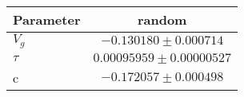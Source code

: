 \begin{tabular}{|l|c|}
    \hline
    Parameter & random \\
    \hline\hline
    $V_g$ & $-0.130180 \pm 0.000714$ \\
    \hline
    $\tau$ & $0.00095959 \pm 0.00000527$ \\
    \hline
    c & $-0.172057 \pm 0.000498$ \\
    \hline
    \end{tabular}